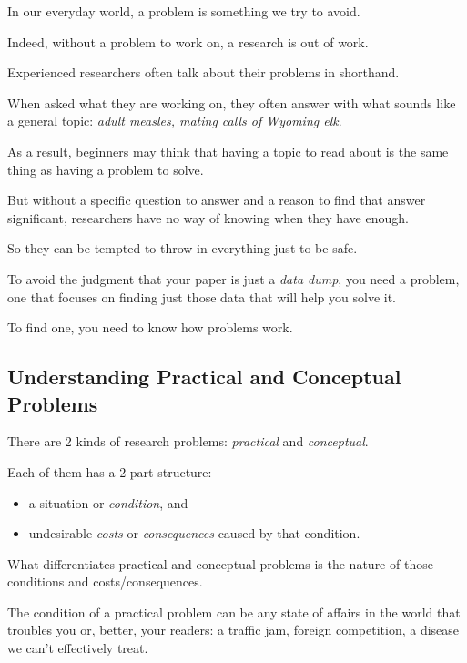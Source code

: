 \documentclass[oneside]{book}
\numberwithin{equation}{section}
\begin{document}
In our everyday world, a problem is something we try to avoid.


Indeed, without a problem to work on, a research is out of work.

%
Experienced researchers often talk about their problems in shorthand.

When asked what they are working on, they often answer with what sounds like a general topic: \textit{adult measles, mating calls of Wyoming elk}.

As a result, beginners may think that having a topic to read about is the same thing as having a problem to solve.

But without a specific question to answer and a reason to find that answer significant, researchers have no way of knowing when they have enough.

So they can be tempted to throw in everything just to be safe.

%
To avoid the judgment that your paper is just a \textit{data dump}, you need a problem, one that focuses on finding just those data that will help you solve it.

To find one, you need to know how problems work.

\subsection{Understanding Practical and Conceptual Problems}
There are 2 kinds of research problems: \textit{practical} and \textit{conceptual}.

Each of them has a 2-part structure:
\begin{itemize}
    \item a situation or \textit{condition}, and
    \item undesirable \textit{costs} or \textit{consequences} caused by that condition.
\end{itemize}

%
What differentiates practical and conceptual problems is the nature of those conditions and costs/consequences.

The condition of a practical problem can be any state of affairs in the world that troubles you or, better, your readers: a traffic jam, foreign competition, a disease we can't effectively treat.
\end{document}
